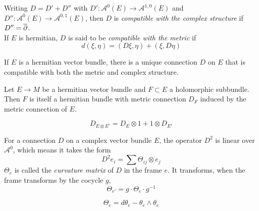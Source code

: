 \begin{defn}

	Writing $D = D' + D''$ with $D': \mathcal{A}^0 (E) \to \mathcal{A}^{ 1,0 }(E)$ and $D'': \mathcal{A}^0(E) \to \mathcal{A}^{ 0,1 }(E)$, then $D$ is \textit{compatible with the complex structure} if $D'' = \overline{\partial}$. \\
	If $E$ is hermitian, $D$ is said to be \textit{compatible with the metric} if 
	\[
		d \left( \xi, \eta \right) = \left( D \xi, \eta \right) + \left( \xi, D \eta \right)
	\]

\end{defn}

\begin{lem}

If $E$ is a hermitian vector bundle, there is a unique connection $D$ on $E$ that is compatible with both the metric and complex structure.

\end{lem}

\begin{lem}

Let $E \to M$ be a hermitian vector bundle and $F \subset E$ a holomorphic subbundle. Then $F$ is itself a hermitian bundle with metric connection $D_F$ induced by the metric connection of $E$.

\end{lem}

\begin{lem}

\[
D_{ E \otimes E' } = D_E \otimes 1 + 1 \otimes D_{ E' }
\]


\end{lem}

\begin{defn}

	For a connection $D$ on a complex vector bundle $E$, the operator $D^2$ is linear over $ \mathcal{A}^0$, which means it takes the form
	\[
	D^2 e_i = \sum \Theta_{ ij } \otimes e_j
	\]
$ \Theta_e$ is called the \textit{curvature matrix} of $D$ in the frame $e$. It transforms, when the frame transforms by the cocycle $g$, 
\[
	\Theta_{ e' } = g \cdot \Theta_e \cdot g^{-1}
\]

\end{defn}

\begin{prop}

\[
\Theta_e = d \theta_e - \theta_e \wedge \theta_e
\]


\end{prop}


